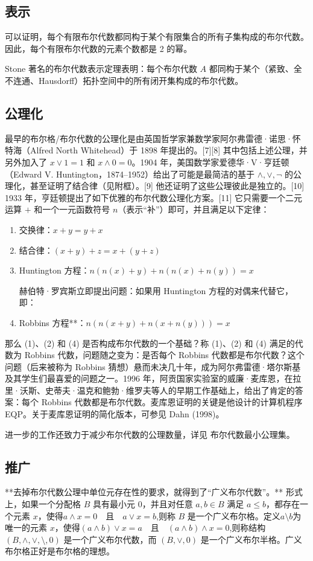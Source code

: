 \subsection{表示}
可以证明，每个有限布尔代数都同构于某个有限集合的所有子集构成的布尔代数。因此，每个有限布尔代数的元素个数都是 2 的幂。

Stone 著名的布尔代数表示定理表明：每个布尔代数 $A$ 都同构于某个（紧致、全不连通、Hausdorff）拓扑空间中的所有闭开集构成的布尔代数。
\subsection{公理化}
最早的布尔格/布尔代数的公理化是由英国哲学家兼数学家阿尔弗雷德·诺思·怀特海（Alfred North Whitehead）于 1898 年提出的。[7][8] 其中包括上述公理，并另外加入了 $x \lor 1 = 1$ 和 $x \land 0 = 0$。1904 年，美国数学家爱德华·V·亨廷顿（Edward V. Huntington，1874–1952）给出了可能是最简洁的基于 $\land, \lor, \lnot$ 的公理化，甚至证明了结合律（见附框）。[9] 他还证明了这些公理彼此是独立的。[10] 1933 年，亨廷顿提出了如下优雅的布尔代数公理化方案。[11] 它只需要一个二元运算 $+$ 和一个一元函数符号 $n$（表示“补”）即可，并且满足以下定律：

\begin{enumerate}
\item 交换律：$x + y = y + x$
\item 结合律：$(x + y) + z = x + (y + z)$
\item Huntington 方程：$n(n(x) + y) + n(n(x) + n(y)) = x$

赫伯特·罗宾斯立即提出问题：如果用 Huntington 方程的对偶来代替它，即：

\item Robbins 方程**：$n(n(x + y) + n(x + n(y))) = x$
\end{enumerate}
那么 (1)、(2) 和 (4) 是否构成布尔代数的一个基础？称 (1)、(2) 和 (4) 满足的代数为 Robbins 代数，问题随之变为：是否每个 Robbins 代数都是布尔代数？这个问题（后来被称为 Robbins 猜想）悬而未决几十年，成为阿尔弗雷德·塔尔斯基及其学生们最喜爱的问题之一。1996 年，阿贡国家实验室的威廉·麦库恩，在拉里·沃斯、史蒂夫·温克和鲍勃·维罗夫等人的早期工作基础上，给出了肯定的答案：每个 Robbins 代数都是布尔代数。麦库恩证明的关键是他设计的计算机程序 EQP。关于麦库恩证明的简化版本，可参见 Dahn (1998)。

进一步的工作还致力于减少布尔代数的公理数量，详见 布尔代数最小公理集。
\subsection{推广}
**去掉布尔代数公理中单位元存在性的要求，就得到了“广义布尔代数”。**
形式上，如果一个分配格 $B$ 具有最小元 $0$，并且对任意 $a, b \in B$ 满足 $a \leq b$，都存在一个元素 $x$，使得$a \land x = 0 \quad \text{且} \quad a \lor x = b$,则称 $B$ 是一个广义布尔格。定义$a \setminus b$为唯一的元素 $x$，使得$(a \land b) \lor x = a \quad \text{且} \quad (a \land b) \land x = 0$,则称结构 $(B, \land, \lor, \setminus, 0)$ 是一个广义布尔代数，而 $(B, \lor, 0)$ 是一个广义布尔半格。广义布尔格正好是布尔格的理想。

